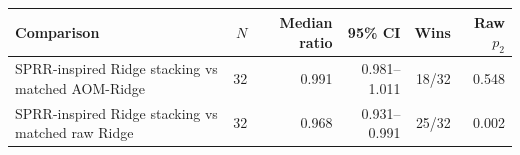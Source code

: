 \begin{tabularx}{\linewidth}{Xrrrrr}
\toprule
Comparison & $N$ & Median ratio & 95\% CI & Wins & Raw $p_2$ \\
\midrule
SPRR-inspired Ridge stacking vs matched AOM-Ridge & 32 & 0.991 & 0.981--1.011 & 18/32 & 0.548 \\
SPRR-inspired Ridge stacking vs matched raw Ridge & 32 & 0.968 & 0.931--0.991 & 25/32 & 0.002 \\
\bottomrule
\end{tabularx}

